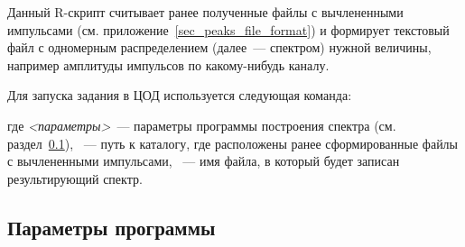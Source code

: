 Данный R-скрипт считывает ранее полученные файлы с вычлененными импульсами (см. приложение~\ref{sec_peaks_file_format}) и формирует текстовый файл с одномерным распределением (далее~--- спектром) нужной величины, например амплитуды импульсов по какому-нибудь каналу.

Для запуска задания в ЦОД используется следующая команда:

\bigskip

\noindent {}

\bigskip
\noindent где {\it <параметры>}~--- параметры программы построения спектра (см. раздел~\ref{sec-peaks-distr-1d-params}), {\it <каталог с файлами импульсов>}~--- путь к каталогу, где расположены ранее сформированные файлы с вычлененными импульсами, {\it <имя результирующего файла>}~--- имя файла, в который будет записан результирующий спектр.

\subsection{Параметры программы}
\label{sec-peaks-distr-1d-params}

